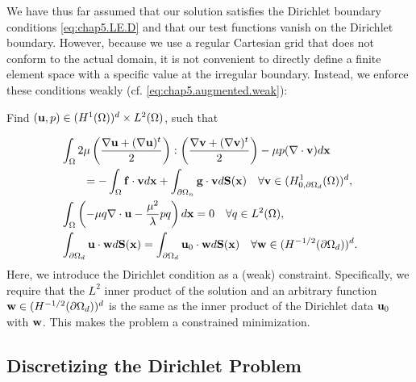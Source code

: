 We have thus far assumed that our solution satisfies the Dirichlet boundary conditions \eqref{eq:chap5.LE.D} and that our test functions vanish on the Dirichlet boundary. However, because we use a regular Cartesian grid that does not conform to the actual domain, it is not convenient to directly define a finite element space with a specific value at the irregular boundary. Instead, we enforce these conditions weakly (cf. \eqref{eq:chap5.augmented.weak}):
\begin{center}
Find $(\mathbf{u},p) \in (H^1(\Omega))^d \times L^2(\Omega)$, such that
\end{center}
\begin{subequations} \label{eq:chap5.dirichlet.weak}
\begin{align}
& \int_{\Omega} 2 \mu \left( \frac{\nabla \mathbf{u} + (\nabla \mathbf{u})^t}{2} \right) : \left( \frac{\nabla \mathbf{v} + (\nabla \mathbf{v})^t}{2} \right) - \mu p (\nabla \cdot \mathbf{v}) d\mathbf{x} \\
& \qquad = -\int_{\Omega} \mathbf{f} \cdot \mathbf{v} d\mathbf{x} + \int_{\partial\Omega_n} \mathbf{g} \cdot \mathbf{v} d\mathbf{S}(\mathbf{x}) \quad \forall \mathbf{v} \in (H^1_{0,\partial\Omega_d}(\Omega))^d, \\
& \int_{\Omega} \left( -\mu q \nabla \cdot \mathbf{u} - \frac{\mu^2}{\lambda} p q \right) d\mathbf{x} = 0 \quad \forall q \in L^2(\Omega), \\
& \int_{\partial\Omega_d} \mathbf{u} \cdot \mathbf{w} d\mathbf{S}(\mathbf{x}) = \int_{\partial\Omega_d} \mathbf{u}_0 \cdot \mathbf{w} d\mathbf{S}(\mathbf{x}) \quad \forall \mathbf{w} \in (H^{-1/2}(\partial\Omega_d))^d. \label{eq:chap5.dirichlet.constraint.continuous}
\end{align}
\end{subequations}
Here, we introduce the Dirichlet condition as a (weak) constraint. Specifically, we require that the $L^2$ inner product of the solution and an arbitrary function $\mathbf{w} \in (H^{-1/2}(\partial\Omega_d))^d$ is the same as the inner product of the Dirichlet data $\mathbf{u}_0$ with $\mathbf{w}$. This makes the problem a constrained minimization.

\subsection{Discretizing the Dirichlet Problem} \label{subsec:chap5.dirichlet.discretization}

